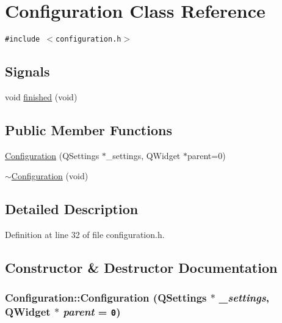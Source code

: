 \hypertarget{classConfiguration}{
\section{Configuration Class Reference}
\label{classConfiguration}
}
{\tt \#include $<$configuration.h$>$}

\subsection*{Signals}
\begin{CompactItemize}
\item 
void \hyperlink{classConfiguration_84909e3f2258ba02ee1120cbbf894348}{finished} (void)
\end{CompactItemize}
\subsection*{Public Member Functions}
\begin{CompactItemize}
\item 
\hyperlink{classConfiguration_10b067d764bd7f777e58ddf18ad814d3}{Configuration} (QSettings $\ast$\_\-settings, QWidget $\ast$parent=0)
\item 
\hyperlink{classConfiguration_094b6e765719f7a801524abac5e46475}{$\sim$Configuration} (void)
\end{CompactItemize}


\subsection{Detailed Description}


Definition at line 32 of file configuration.h.

\subsection{Constructor \& Destructor Documentation}
\hypertarget{classConfiguration_10b067d764bd7f777e58ddf18ad814d3}{
\subsubsection[{Configuration}]{\setlength{\rightskip}{0pt plus 5cm}Configuration::Configuration (QSettings $\ast$ {\em \_\-settings}, \/  QWidget $\ast$ {\em parent} = {\tt 0})}}
\label{classConfiguration_10b067d764bd7f777e58ddf18ad814d3}




